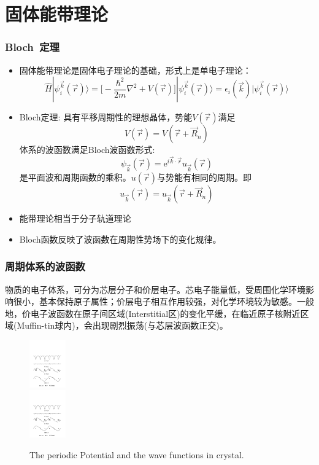 {\section{固体能带理论}       %
\frame
{
	\frametitle{\textrm{Bloch~}定理}
\begin{itemize}%
   \setlength{\itemsep}{8pt}
   \item 固体能带理论是固体电子理论的基础，形式上是单电子理论：
    $$\hat H |\psi_i^{\vec k}(\vec r)\rangle=\bigg[-\dfrac{\hbar^2}{2m}\nabla^2+V(\vec r)\bigg]|\psi_i^{\vec k}(\vec r)\rangle=\epsilon_i(\vec k)|\psi_i^{\vec k}(\vec r)\rangle$$
  \item \textrm{Bloch}定理:
具有平移周期性的理想晶体，势能$V(\vec r)$满足$$V(\vec r)=V(\vec r+\vec R_n)$$
体系的波函数满足\textrm{Bloch}波函数形式:$$\psi_{\vec k}(\vec r)=\textrm{e}^{i\vec k\cdot\vec r}u_{\vec k}(\vec r)$$
是平面波和周期函数的乘积。$u(\vec r)$与势能有相同的周期。即$$u_{\vec k}(\vec r)=u_{\vec k}(\vec r+\vec R_n)$$
  \item 能带理论相当于分子轨道理论
\item \textrm{Bloch}函数反映了波函数在周期性势场下的变化规律。
\end{itemize}
}

\frame
{
\frametitle{周期体系的波函数}
物质的电子体系，可分为芯层分子和价层电子。芯电子能量低，受周围化学环境影响很小，基本保持原子属性；价层电子相互作用较强，对化学环境较为敏感。一般地，价电子波函数在原子间区域(\textrm{Interstitial}区)的变化平缓，在临近原子核附近区域(\textrm{Muffin-tin}球内)，会出现剧烈振荡(与芯层波函数正交)。
\begin{figure}[h!]
\centering
\includegraphics[height=0.8in,width=4.in,viewport=41 433 539 546,clip]{Figures/Pseudo_wave.pdf}\\
\includegraphics[height=0.8in,width=4.in,viewport=41 210 539 339,clip]{Figures/Pseudo_wave.pdf}
\caption{\tiny \textrm{The periodic Potential and the wave functions in crystal.}}%
\label{Potential-Wave}
\end{figure}
}

}
